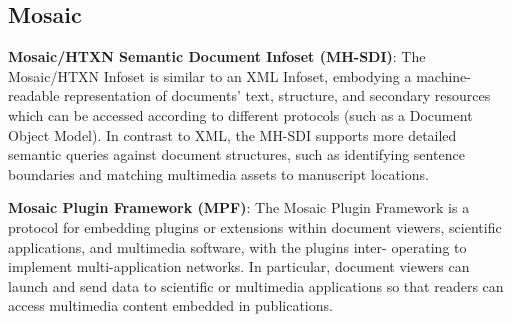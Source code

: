 \atsp
\begin{frame}{}
\section{Mosaic}

\vspace*{5pt}
{\thrulex}

{\fontsize{18}{25}\selectfont
\hspace*{7pt}\begin{minipage}{.996\textwidth}
\vspace{-1pt}



		

{\setlength{\leftmargini}{13pt}\begin{enumerate}
\vspace{11pt}
\dmitem \textbf{Mosaic/HTXN Semantic Document 
Infoset (MH-SDI)}:  \hspace{.25em} 
The Mosaic/HTXN Infoset is similar to an XML Infoset, 
embodying a machine-readable representation of documents' 
text, structure, and secondary resources which 
can be accessed according to different protocols 
(such as a Document Object Model).  In contrast to 
XML, the MH-SDI supports more detailed semantic 
queries against document structures, such as 
identifying sentence boundaries and matching 
multimedia assets to manuscript locations. 

\vspace{27pt}  
\dmitem \textbf{Mosaic Plugin Framework (MPF)}:  \hspace{.25em} 
The Mosaic Plugin Framework is a \\
protocol for 
embedding plugins or extensions within document 
viewers, scientific applications, and multimedia 
software, with the plugins inter- operating to implement 
multi-application networks.  In particular, 
document viewers can launch and send data to 
scientific or multimedia applications so 
that readers can access multimedia content 
embedded in publications.

\end{enumerate}
}

\end{minipage}
}


\end{frame}
